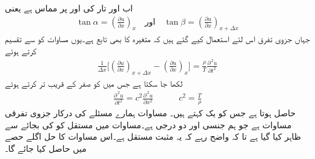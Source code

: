 اب  اور  تار کی  اور  پر مماس ہے یعنی
\begin{align*}
\tan \alpha=\left(\frac{\partial u}{\partial x}\right)_x \quad \text{اور} \quad \tan \beta=\left(\frac{\partial u}{\partial x}\right)_{x+\Delta x}
\end{align*}
جہاں جزوی تفرق اس لئے استعمال کیے  گئے ہیں کہ  متغیرہ  کا بھی تابع  ہے۔یوں مساوات  کو  سے تقسیم کرتے ہوئے
\begin{align*}
\frac{1}{\Delta x}\big[\left(\frac{\partial u}{\partial x}\right)_{x+\Delta x}-\left(\frac{\partial u}{\partial x}\right)_{x}\big]=\frac{\rho}{T}\frac{\partial^{\,2}u}{\partial t^2}
\end{align*}
لکھا جا سکتا ہے جس میں  کو صفر کے قریب تر کرتے ہوئے
\begin{align}\label{مساوات_جزوی_تار_ت}
\frac{\partial^{\,2}u}{\partial t^2}=c^2\frac{\partial^{\,2}u}{\partial x^2}\quad \quad \quad c^2=\frac{T}{\rho}
\end{align}
حاصل ہوتا ہے جس کو یک  کہتے ہیں۔ مساوات  ہمارے مسئلے کی درکار جزوی تفرقی مساوات ہے جو ہم جنسی اور دو درجی ہے۔مساوات میں مستقل  کو  کی بجائے  سے ظاہر کیا گیا ہے تا کہ واضح رہے کہ یہ مثبت مستقل ہے۔اس مساوات کا حل اگلے حصے میں حاصل کیا جائے گا۔

